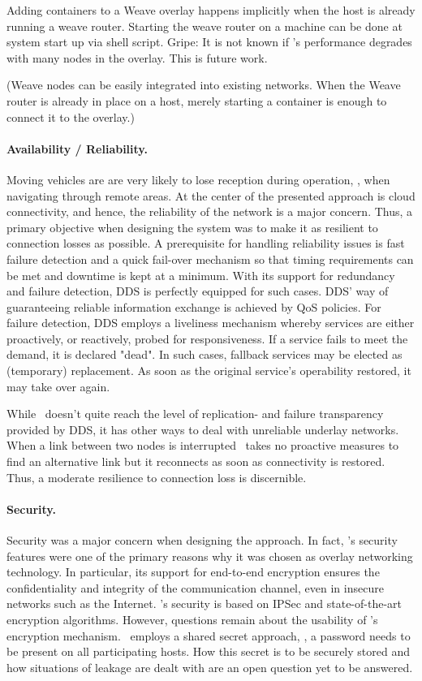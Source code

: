 Adding containers to a Weave overlay happens implicitly when the host is already running a weave router. Starting the weave router on a machine can be done at system start up via shell script. Gripe: It is not known if \weave 's performance degrades with many nodes in the overlay. This is future work.

(Weave nodes can be easily integrated into existing networks. When the Weave router is already in place on a host, merely starting a container is enough to connect it to the overlay.)

\paragraph{Availability / Reliability.}
Moving vehicles are are very likely to lose reception during operation, \eg , when navigating through remote areas. At the center of the presented approach is cloud connectivity, and hence, the reliability of the network is a major concern. Thus, a primary objective when designing the system was to make it as resilient to connection losses as possible. A prerequisite for handling reliability issues is fast failure detection and a quick fail-over mechanism so that timing requirements can be met and downtime is kept at a minimum. With its support for redundancy and failure detection, DDS is perfectly equipped for such cases. DDS' way of guaranteeing reliable information exchange is achieved by QoS policies. For failure detection, DDS employs a liveliness mechanism whereby services are either proactively, or reactively, probed for responsiveness. If a service fails to meet the demand, it is declared "dead". In such cases, fallback services may be elected as (temporary) replacement. As soon as the original service's operability restored, it may take over again.

While \wnet\ doesn't quite reach the level of replication- and failure transparency provided by DDS, it has other ways to deal with unreliable underlay networks. When a link between two nodes is interrupted \weave\ takes no proactive measures to find an alternative link but it reconnects as soon as connectivity is restored. Thus, a moderate resilience to connection loss is discernible.

\paragraph{Security.}
Security was a major concern when designing the approach. In fact, \weave 's security features were one of the primary reasons why it was chosen as overlay networking technology. In particular, its support for end-to-end encryption ensures the confidentiality and integrity of the communication channel, even in insecure networks such as the Internet. \wnet 's security is based on IPSec and state-of-the-art encryption algorithms. However, questions remain about the usability of \weave 's encryption mechanism. \weave\ employs a shared secret approach, \ie , a password needs to be present on all participating hosts. How this secret is to be securely stored and how situations of leakage are dealt with are an open question yet to be answered.

